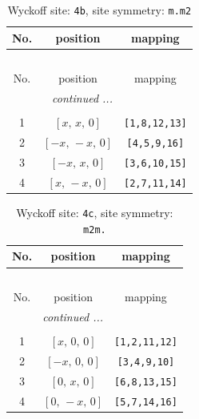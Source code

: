 \documentclass[fleqn,8pt]{jsarticle}
\begin{document}
\begin{longtable}{ccc}
\caption{Wyckoff site: {\tt 4b}, site symmetry: {\tt m.m2}}
 \\
 \hline \hline
No. & position & mapping \\ \hline \endfirsthead

\multicolumn{2}{l}{\tablename\ \thetable{}} \\
 \hline \hline
No. & position & mapping \\ \hline \endhead

 \hline \hline
\multicolumn{2}{r}{\footnotesize\it continued ...} \\ \endfoot

 \hline \hline
\multicolumn{2}{r}{} \\ \endlastfoot

1 & $\left[ x,\, x,\, 0 \right]$ & {\tt [1,8,12,13]} \\ \hline
2 & $\left[ - x,\, - x,\, 0 \right]$ & {\tt [4,5,9,16]} \\ \hline
3 & $\left[ - x,\, x,\, 0 \right]$ & {\tt [3,6,10,15]} \\ \hline
4 & $\left[ x,\, - x,\, 0 \right]$ & {\tt [2,7,11,14]} \\
\end{longtable}
\renewcommand{\arraystretch}{1.2}
\begin{longtable}{ccc}
\caption{Wyckoff site: {\tt 4c}, site symmetry: {\tt m2m.}}
 \\
 \hline \hline
No. & position & mapping \\ \hline \endfirsthead

\multicolumn{2}{l}{\tablename\ \thetable{}} \\
 \hline \hline
No. & position & mapping \\ \hline \endhead

 \hline \hline
\multicolumn{2}{r}{\footnotesize\it continued ...} \\ \endfoot

 \hline \hline
\multicolumn{2}{r}{} \\ \endlastfoot

1 & $\left[ x,\, 0,\, 0 \right]$ & {\tt [1,2,11,12]} \\ \hline
2 & $\left[ - x,\, 0,\, 0 \right]$ & {\tt [3,4,9,10]} \\ \hline
3 & $\left[ 0,\, x,\, 0 \right]$ & {\tt [6,8,13,15]} \\ \hline
4 & $\left[ 0,\, - x,\, 0 \right]$ & {\tt [5,7,14,16]} \\
\end{longtable}
\end{document}
